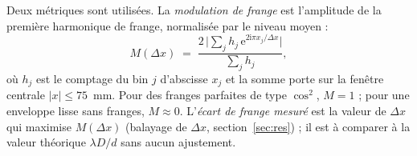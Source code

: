 \documentclass[11pt,a4paper]{article}
\newcommand{\dx}{\Delta x}
\begin{document}
Deux métriques sont utilisées. La \emph{modulation de frange} est l'amplitude de la
première harmonique de frange, normalisée par le niveau moyen :
\begin{equation}\label{eq:M}
  M(\dx) \;=\; \frac{2\,\bigl\lvert \sum_j h_j\,
  \mathrm{e}^{2\mathrm{i}\pi x_j/\dx} \bigr\rvert}{\sum_j h_j},
\end{equation}
où $h_j$ est le comptage du bin $j$ d'abscisse $x_j$ et la somme porte sur la
fenêtre centrale $|x| \le 75$~mm. Pour des franges parfaites de type
$\cos^2$, $M = 1$ ; pour une enveloppe lisse sans franges, $M \approx 0$.
L'\emph{écart de frange mesuré} est la valeur de $\dx$ qui maximise $M(\dx)$
(balayage de $\dx$, section~\ref{sec:res}) ; il est à comparer à la valeur
théorique $\lambda D/d$ sans aucun ajustement.


\end{document}
